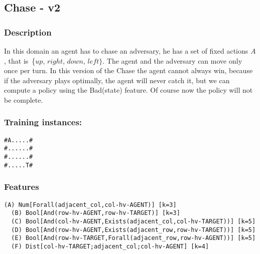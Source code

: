 \documentclass[a4paper]{article}
\begin{document}
\subsection{Chase - v2}
\subsubsection{Description}
In this domain an agent has to chase an adversary, he has a set of fixed actions $A$, that is~\{$up$, $right$, $down$, $left\}$. The agent and the adversary can move only once per turn. In this version of the Chase the agent cannot always win, because if the adversary plays optimally, the agent will never catch it, but we can compute a policy using the Bad(state) feature. Of course now the policy will not be complete.

\subsubsection{Training instances:}
\begin{Verbatim}[fontsize=\footnotesize]
#A.....#
#......#
#......#
#.....T#
\end{Verbatim}

\subsubsection{Features}
\begin{Verbatim}[fontsize=\footnotesize]
  (A) Num[Forall(adjacent_col,col-hv-AGENT)] [k=3]
  (B) Bool[And(row-hv-AGENT,row-hv-TARGET)] [k=3]
  (C) Bool[And(col-hv-AGENT,Exists(adjacent_col,col-hv-TARGET))] [k=5]
  (D) Bool[And(row-hv-AGENT,Exists(adjacent_row,row-hv-TARGET))] [k=5]
  (E) Bool[And(row-hv-TARGET,Forall(adjacent_row,row-hv-AGENT))] [k=5]
  (F) Dist[col-hv-TARGET;adjacent_col;col-hv-AGENT] [k=4]
\end{Verbatim}
\end{document}
